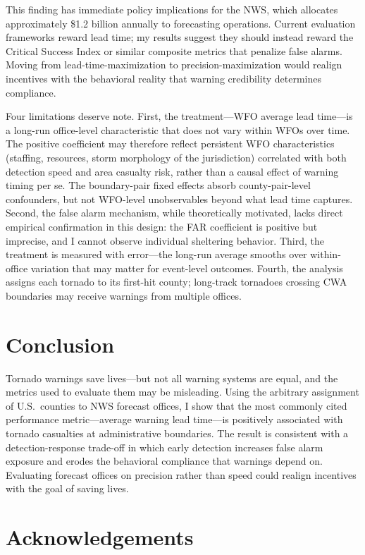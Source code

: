 \documentclass[12pt]{article}
\begin{document}
This finding has immediate policy implications for the NWS, which allocates approximately \$1.2 billion annually to forecasting operations. Current evaluation frameworks reward lead time; my results suggest they should instead reward the Critical Success Index or similar composite metrics that penalize false alarms. Moving from lead-time-maximization to precision-maximization would realign incentives with the behavioral reality that warning credibility determines compliance.

Four limitations deserve note. First, the treatment---WFO average lead time---is a long-run office-level characteristic that does not vary within WFOs over time. The positive coefficient may therefore reflect persistent WFO characteristics (staffing, resources, storm morphology of the jurisdiction) correlated with both detection speed and area casualty risk, rather than a causal effect of warning timing per se. The boundary-pair fixed effects absorb county-pair-level confounders, but not WFO-level unobservables beyond what lead time captures. Second, the false alarm mechanism, while theoretically motivated, lacks direct empirical confirmation in this design: the FAR coefficient is positive but imprecise, and I cannot observe individual sheltering behavior. Third, the treatment is measured with error---the long-run average smooths over within-office variation that may matter for event-level outcomes. Fourth, the analysis assigns each tornado to its first-hit county; long-track tornadoes crossing CWA boundaries may receive warnings from multiple offices.

\section{Conclusion}

Tornado warnings save lives---but not all warning systems are equal, and the metrics used to evaluate them may be misleading. Using the arbitrary assignment of U.S.\ counties to NWS forecast offices, I show that the most commonly cited performance metric---average warning lead time---is positively associated with tornado casualties at administrative boundaries. The result is consistent with a detection-response trade-off in which early detection increases false alarm exposure and erodes the behavioral compliance that warnings depend on. Evaluating forecast offices on precision rather than speed could realign incentives with the goal of saving lives.

\section*{Acknowledgements}
\end{document}
